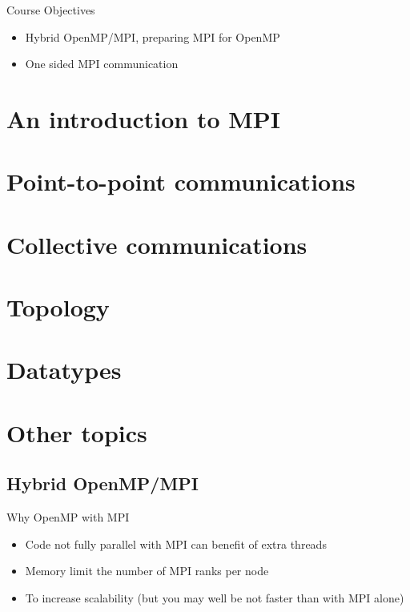\documentclass[aspectratio=43]{beamer}
\begin{document}
\cscstitle

\begin{frame}{Course Objectives}
\begin{itemize}
\item Hybrid OpenMP/MPI, preparing MPI for OpenMP
\item One sided MPI communication
\end{itemize}
\end{frame}


\section{An introduction to MPI}
\section{Point-to-point communications}
\section{Collective communications}
\section{Topology}
\section{Datatypes}
\section{Other topics}


\subsection{Hybrid OpenMP/MPI}

\begin{frame}[fragile]{Why OpenMP with MPI}
\begin{itemize}
\item Code not fully parallel with MPI can benefit of extra threads
\item Memory limit the number of MPI ranks per node
\item To increase scalability (but you may well be not faster than with MPI alone)
\end{itemize}
\end{frame}
\end{document}
